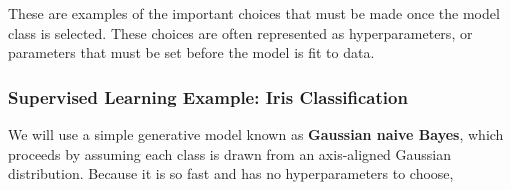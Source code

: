 These are examples of the important choices that must be made once the model class is
selected. These choices are often represented as hyperparameters, or parameters that
must be set before the model is fit to data.

\subsubsection*{Supervised Learning Example: Iris Classification}
We will use a simple generative model known as \textbf{Gaussian naive Bayes},
which proceeds by assuming each class is drawn from an axis-aligned Gaussian distribution. Because it is so fast and has no hyperparameters to choose,
